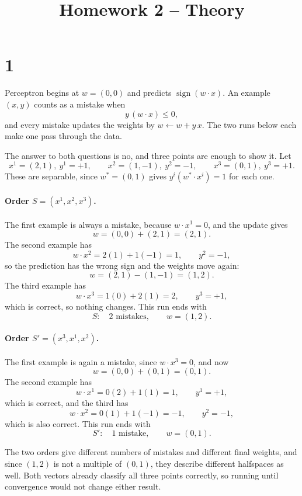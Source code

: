 \documentclass[11pt]{article}
\title{Homework 2 -- Theory}
\author{}
\date{}
\begin{document}
\maketitle

\section*{1}

Perceptron begins at \(w=(0,0)\) and predicts \(\operatorname{sign}(w\cdot x)\).
An example \((x,y)\) counts as a mistake when
\[
y\,(w\cdot x)\le 0,
\]
and every mistake updates the weights by \(w\leftarrow w+y\,x\). The two runs
below each make one pass through the data.

The answer to both questions is no, and three points are enough to show it.
Let
\[
x^1=(2,1),\ y^1=+1,
\qquad
x^2=(1,-1),\ y^2=-1,
\qquad
x^3=(0,1),\ y^3=+1 .
\]
These are separable, since \(w^*=(0,1)\) gives \(y^i(w^*\!\cdot x^i)=1\) for
each one.

\paragraph{Order \(S=(x^1,x^2,x^3)\).}

The first example is always a mistake, because \(w\cdot x^1=0\), and the
update gives
\[
w=(0,0)+(2,1)=(2,1).
\]
The second example has
\[
w\cdot x^2=2(1)+1(-1)=1,
\qquad
y^2=-1,
\]
so the prediction has the wrong sign and the weights move again:
\[
w=(2,1)-(1,-1)=(1,2).
\]
The third example has
\[
w\cdot x^3=1(0)+2(1)=2,
\qquad
y^3=+1,
\]
which is correct, so nothing changes. This run ends with
\[
\boxed{
S:\quad 2\text{ mistakes},\qquad w=(1,2).
}
\]

\paragraph{Order \(S'=(x^3,x^1,x^2)\).}

The first example is again a mistake, since \(w\cdot x^3=0\), and now
\[
w=(0,0)+(0,1)=(0,1).
\]
The second example has
\[
w\cdot x^1=0(2)+1(1)=1,
\qquad
y^1=+1,
\]
which is correct, and the third has
\[
w\cdot x^2=0(1)+1(-1)=-1,
\qquad
y^2=-1,
\]
which is also correct. This run ends with
\[
\boxed{
S':\quad 1\text{ mistake},\qquad w=(0,1).
}
\]

The two orders give different numbers of mistakes and different final
weights, and since \((1,2)\) is not a multiple of \((0,1)\), they describe
different halfspaces as well. Both vectors already classify all three points
correctly, so running until convergence would not change either result.
\end{document}
